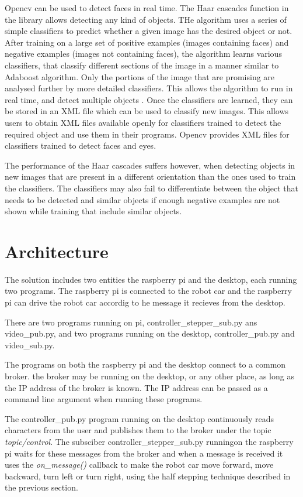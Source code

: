 \documentclass[sigconf]{acmart}
\begin{document}
Opencv can be used to detect faces in real time. The Haar cascades function in the library allows detecting any kind of objects. THe algorithm uses a series of simple classifiers to predict whether a given image has the desired object or not. After training on a large set of positive examples (images containing faces) and negative examples (images not containing faces), the algorithm learns various classifiers, that classify different sections of the image in a manner similar to Adaboost algorithm. Only the portions of the image that are promising are analysed further by more detailed classifiers. This allows the algorithm to run in real time, and detect multiple objects \cite{opencv-haar}\cite{haar-wiki}. Once the classifiers are learned, they can be stored in an XML file which can be used to classify new images. This allows users to obtain XML files available openly for classifiers trained to detect the required object and use them in their programs. Opencv provides XML files for classifiers trained to detect faces and eyes.

The performance of the Haar cascades suffers however, when detecting objects in new images that are present in a different orientation than the ones used to train the classifiers. The classifiers may also fail to differentiate between the object that needs to be detected and similar objects if enough negative examples are not shown while training that include similar objects.

\section{Architecture}

The solution includes two entities the raspberry pi and the desktop, each running two programs. The raspberry pi is connected to the robot car and the raspberry pi can drive the robot car accordig to he message it recieves from the desktop.

There are two programs running on pi, controller\_stepper\_sub.py ans video\_pub.py, and two programs running on the desktop, controller\_pub.py and video\_sub.py.

The programs on both the raspberry pi and the desktop connect to a common broker. the broker may be running on the desktop, or any other place, as long as the IP address of the broker is known. The IP address can be passed as a command line argument when running these programs.

The controller\_pub.py program running on the desktop continuously reads characters from the user and publishes them to the broker under the topic {\em topic/control}. The subsciber controller\_stepper\_sub.py runningon the raspberry pi waits for these messages from the broker and when a message is received it uses the {\em on\_message()} callback to make the robot car move forward, move backward, turn left or turn right, using the half stepping technique described in the previous section.
\end{document}
